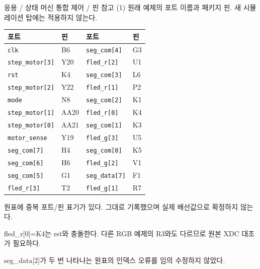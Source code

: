 \documentclass[aspectratio=169,11pt]{beamer}
\newcommand{\sourceref}[1]{}
\begin{document}
\begin{frame}[t]{응용 / 상태 머신 통합 제어 / 핀 참고 (1)}
\fontsize{8}{9}\selectfont
원래 예제의 포트 이름과 패키지 핀. 새 시뮬레이션 탑에는 적용하지 않는다.
\begin{center}\renewcommand{\arraystretch}{1.0}
\begin{tabular}{ll@{\hspace{1.1cm}}ll}\toprule
포트 & 핀 & 포트 & 핀\\\midrule
\texttt{clk} & B6 & \texttt{seg\_com[4]} & G3 \\
\texttt{step\_motor[3]} & Y20 & \texttt{fled\_r[2]} & U1 \\
\texttt{rst} & K4 & \texttt{seg\_com[3]} & L6 \\
\texttt{step\_motor[2]} & Y22 & \texttt{fled\_r[1]} & P2 \\
\texttt{mode} & N8 & \texttt{seg\_com[2]} & K1 \\
\texttt{step\_motor[1]} & AA20 & \texttt{fled\_r[0]} & K4 \\
\texttt{step\_motor[0]} & AA21 & \texttt{seg\_com[1]} & K3 \\
\texttt{motor\_sense} & Y19 & \texttt{fled\_g[3]} & U5 \\
\texttt{seg\_com[7]} & H4 & \texttt{seg\_com[0]} & K5 \\
\texttt{seg\_com[6]} & H6 & \texttt{fled\_g[2]} & V1 \\
\texttt{seg\_com[5]} & G1 & \texttt{seg\_data[7]} & F1 \\
\texttt{fled\_r[3]} & T2 & \texttt{fled\_g[1]} & R7 \\\bottomrule\end{tabular}\end{center}
{\scriptsize 원표에 중복 포트/핀 표기가 있다. 그대로 기록했으며 실제 배선값으로 확정하지 않는다.\par fled\_r[0]=K4는 rst와 충돌한다. 다른 RGB 예제의 R3와도 다르므로 원본 XDC 대조가 필요하다.\par seg\_data[2]가 두 번 나타나는 원표의 인덱스 오류를 임의 수정하지 않았다.\par}
\sourceref{9.1\_스테이트 머신의 구현, p.28}\end{frame}
\end{document}
